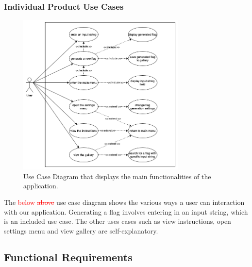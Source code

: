 \documentclass[12pt, titlepage]{article}
\begin{document}
\pagebreak

\subsubsection{Individual Product Use Cases}

\begin{figure}[h!]
    \centering
    \includegraphics[width=0.75\textwidth]{FRs_UseCaseDiagram.png}
    \caption{Use Case Diagram that displays the main functionalities of the application.}
    \label{fig:FRs_UCD}
\end{figure}

\noindent The \textcolor{red}{below \sout{above}} use case diagram shows the various ways a user can interaction with our application. Generating a flag involves entering in an input string, which is an included use case. The other uses cases such as view instructions, open settings menu and view gallery are self-explanatory.

\pagebreak

\subsection{Functional Requirements}
\end{document}
